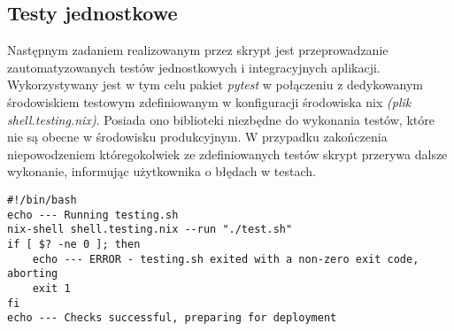 \subsection{Testy jednostkowe}
Następnym zadaniem realizowanym przez skrypt jest przeprowadzanie zautomatyzowanych testów jednostkowych i integracyjnych aplikacji. Wykorzystywany jest w tym celu pakiet \textit{pytest} w połączeniu z dedykowanym środowiskiem testowym zdefiniowanym w konfiguracji środowiska nix \textit{(plik shell.testing.nix)}. Posiada ono biblioteki niezbędne do wykonania testów, które nie są obecne w środowisku produkcyjnym. W przypadku zakończenia niepowodzeniem któregokolwiek ze zdefiniowanych testów skrypt przerywa dalsze wykonanie, informując użytkownika o błędach w testach.
\lstset{style=shell}
\begin{lstlisting}[caption = {Wywołanie skryptu pozwalającego na automatyczne testowanie aplikacji w ramach środowiska zdefiniowanego w pliku \textit{shell.testing.sh}}]
#!/bin/bash
echo --- Running testing.sh 
nix-shell shell.testing.nix --run "./test.sh"
if [ $? -ne 0 ]; then
    echo --- ERROR - testing.sh exited with a non-zero exit code, aborting
    exit 1
fi
echo --- Checks successful, preparing for deployment
\end{lstlisting}
